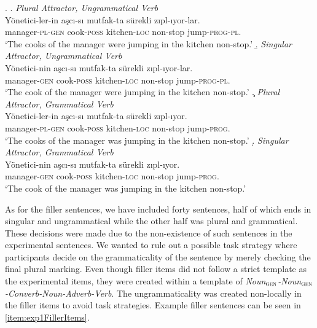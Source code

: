 \documentclass[doc,a4paper,man,natbib,floatsintext,noextraspace]{apa6}\usepackage[]{graphicx}\usepackage[]{color}
\begin{document}
\ex. \label{item:exp1ExperimentalItems}
\a. \textit{Plural Attractor, Ungrammatical Verb} \label{item:exp1expitem-plpl}\\ 
\gll *Yönetici-ler-in aşcı-sı mutfak-ta sürekli zıpl-ıyor-lar.\\ 
manager-\textsc{pl}-\textsc{gen}  cook-\textsc{poss} kitchen-\textsc{loc} non-stop  jump-\textsc{prog}-\textsc{pl}.\\
\glt `The cooks of the manager were jumping in the kitchen non-stop.' 
\b. \textit{Singular Attractor, Ungrammatical Verb} \label{item:exp1expitem-sgpl}\\ 
\gll *Yönetici-nin aşcı-sı mutfak-ta sürekli zıpl-ıyor-lar.\\ 
manager-\textsc{gen}  cook-\textsc{poss} kitchen-\textsc{loc} non-stop  jump-\textsc{prog}-\textsc{pl}.\\
\glt `The cook of the manager were jumping in the kitchen non-stop.'
\c. \textit{Plural Attractor, Grammatical Verb} \label{item:exp1expitem-plsg}\\ 
\gll Yönetici-ler-in aşcı-sı mutfak-ta sürekli zıpl-ıyor.\\ 
manager-\textsc{pl}-\textsc{gen}  cook-\textsc{poss} kitchen-\textsc{loc} non-stop  jump-\textsc{prog}.\\
\glt `The cooks of the manager was jumping in the kitchen non-stop.'
\d. \textit{Singular Attractor, Grammatical Verb}\label{item:exp1expitem-sgsg}\\ 
\gll Yönetici-nin aşcı-sı mutfak-ta sürekli zıpl-ıyor. \\ 
manager-\textsc{gen}  cook-\textsc{poss} kitchen-\textsc{loc} non-stop  jump-\textsc{prog}.\\
\glt `The cook of the manager was jumping in the kitchen non-stop.'

As for the filler sentences, we have included forty sentences, half of which ends in singular and ungrammatical while the other half was plural and grammatical. These decisions were made due to the non-existence of such sentences in the experimental sentences. We wanted to rule out a possible task strategy where participants decide on the grammaticality of the sentence by merely checking the final plural marking. Even though filler items did not follow a strict template as the experimental items, they were created within a template of \textit{Noun$_{{\textsc{gen}}}$-Noun$_{{\textsc{gen}}}$-Converb-Noun-Adverb-Verb}. The ungrammaticality was created non-locally in the filler items to avoid task strategies. Example filler sentences can be seen in \ref{item:exp1FillerItems}.
\end{document}
